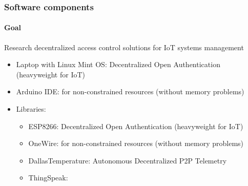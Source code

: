 \documentclass[
    aspectratio=169,                   %
]{beamer}
\begin{document}
    \begin{frame}
        \frametitle{Software components}

        \paragraph{Goal} Research decentralized access control solutions for IoT systems management

        \begin{itemize}
            \item \alert{Laptop with Linux Mint OS}: Decentralized Open Authentication (heavyweight for IoT)
            \item \alert{Arduino IDE\cite{arduinoide}}: for non-constrained resources (without memory problems)
            
            \item \alert{Libraries:}
            \begin{itemize}
                \item \alert{ESP8266}: Decentralized Open Authentication (heavyweight for IoT)
                \item \alert{OneWire}: for non-constrained resources (without memory problems)
                \item \alert{DallasTemperature}: Autonomous Decentralized P2P Telemetry   
                \item \alert{ThingSpeak}:      
            \end{itemize}
        \end{itemize}

    \end{frame}
\end{document}
